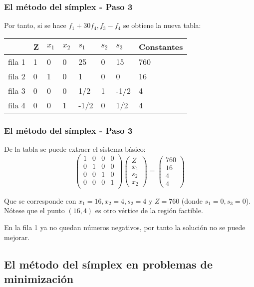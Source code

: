 \documentclass{beamer}
\begin{document}
\begin{frame}
\frametitle{El m\'etodo del s\'implex - Paso 3}
Por tanto, si se hace $f_1+30f_4, f_3-f_4$ se obtiene la nueva tabla:
\begin{tabular}{ |p{1cm}||p{0.8cm}|p{0.8cm}|p{0.8cm}|p{0.8cm}|p{0.8cm}|p{0.8cm}|p{1.6cm}|  }
 \hline
 & Z & $x_1$ & $x_2$ & $s_1$& $s_2$ & $s_3$ & Constantes \\
 \hline
fila 1 &1 & 0 & 0 & 25& 0& 15 & 760 \\
fila 2 & 0 &  1 & 0 & 1 & 0 & 0 & 16 \\
fila 3 & 0 & 0 & 0 & 1/2 & 1 & -1/2  & 4 \\
fila 4 &  0 & 0 & 1 &-1/2 &0 & 1/2  & 4\\
      \hline
\end{tabular}
\end{frame}




\begin{frame}
\frametitle{El m\'etodo del s\'implex - Paso 3}
De la tabla se puede extraer el sistema b\'asico:
\[\left(\begin{array}{cccc}
1&0&0&0 \\
0&1&0&0 \\
0&0&1&0 \\
0&0&0&1 \\
 \end{array}\right)
 \left(\begin{array}{c}
Z\\x_1\\ s_2\\x_2
 \end{array}\right) = 
  \left(\begin{array}{c}
760\\16\\4\\4
 \end{array}\right) 
 \]

Que se corresponde con $x_1=16, x_2 = 4, s_2 = 4$ y $Z=760$ (donde $s_1=0, s_3 = 0$). N\'otese que el punto $(16,4)$ es otro v\'ertice de la regi\'on factible. 

En la fila 1 ya no quedan n\'umeros negativos, por tanto la soluci\'on no se puede mejorar.
\end{frame}

\subsection{El m\'etodo del s\'implex en problemas de minimizaci\'on}
\end{document}
